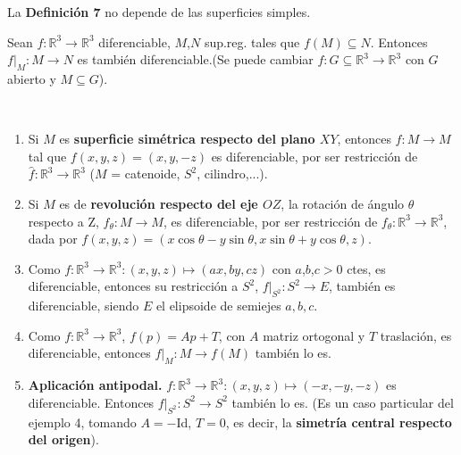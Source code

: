 \documentclass[twoside]{report}
\begin{document}
\begin{prop}
La \textup{\textbf{Definici\'on 7}} no depende de las superficies simples.
\end{prop}

\begin{teorema}
Sean  $f: \mathbb{R}^3 \rightarrow \mathbb{R}^3$ diferenciable, $M$,$N$ sup.reg. tales que $f(M) \subseteq N$. Entonces $f\vert_M : M \rightarrow N$ es tambi\'en diferenciable.(Se puede cambiar $f: G \subseteq \mathbb{R}^3 \rightarrow \mathbb{R}^3$ con $G$ abierto y $M\subseteq G$).
\end{teorema}

\begin{ej}

\

\begin{enumerate}
\item
Si $M$ es \textbf{superficie sim\'etrica respecto del plano $XY$}, entonces $f: M \rightarrow M$ tal que $f(x,y,z)=(x,y,-z)$ es diferenciable, por ser restricci\'on de $\widehat{f} : \mathbb{R}^3 \rightarrow \mathbb{R}^3$ ($M$ = catenoide, $S^2$, cilindro,...).

\item Si $M$ es de \textbf{revoluci\'on respecto del eje $OZ$}, la rotaci\'on de \'angulo $\theta$ respecto a Z, $f_{\theta}: M\rightarrow M$, es diferenciable, por ser restricci\'on de $f_{\theta}: \mathbb{R}^3 \rightarrow \mathbb{R}^3$, dada por $f(x,y,z)=(x\cos\theta - y\sin\theta, x\sin\theta+ y\cos\theta,z)$.

\item
Como $f: \mathbb{R}^3 \rightarrow \mathbb{R}^3:(x,y,z)\longmapsto(ax,by,cz)$ con $a$,$b$,$c >0$ ctes, es diferenciable, entonces su restricci\'on a $S^2$, $f\vert_{S^2}: S^2 \rightarrow E$, tambi\'en es diferenciable, siendo $E$ el elipsoide de semiejes $a,b,c$.

\item
Como $f: \mathbb{R}^3 \rightarrow \mathbb{R}^3$, $f(p)= Ap + T$, con $A$ matriz ortogonal y $T$ traslaci\'on, es diferenciable, entonces $f\vert_{M}: M \rightarrow f(M)$ tambi\'en lo es.

\item \textbf{Aplicaci\'on antipodal.}
$f: \mathbb{R}^3 \rightarrow \mathbb{R}^3:(x,y,z) \longmapsto (-x,-y,-z)$ es diferenciable. Entonces $f\vert_{S^2}: S^2 \rightarrow S^2$ tambi\'en lo es. (Es un caso particular del ejemplo 4, tomando $A= -$Id, $T=0$, es decir, la \textbf{simetr\'ia central respecto del origen}).
\end{enumerate}
\end{ej}
\end{document}
